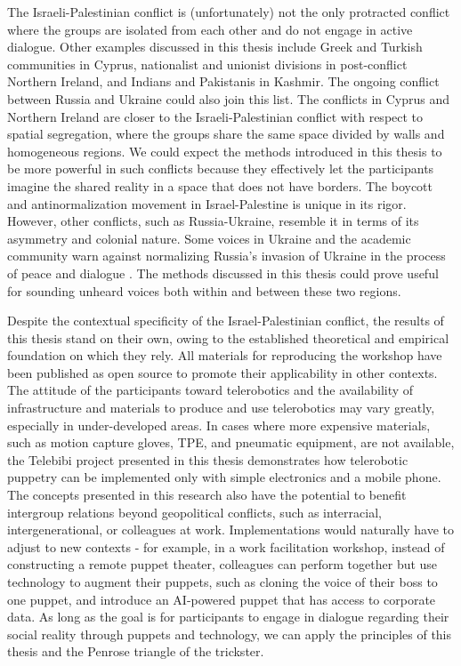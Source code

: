 \documentclass[dissertation,math,vertlayout,pdfa,colorlinks]{aaltoseries}
\begin{document}
The Israeli-Palestinian conflict is (unfortunately) not the only protracted conflict where the groups are isolated from each other and do not engage in active dialogue. Other examples discussed in this thesis include Greek and Turkish communities in Cyprus, nationalist and unionist divisions in post-conflict Northern Ireland, and Indians and Pakistanis in Kashmir. The ongoing conflict between Russia and Ukraine could also join this list. The conflicts in Cyprus and Northern Ireland are closer to the Israeli-Palestinian conflict with respect to spatial segregation, where the groups share the same space divided by walls and homogeneous regions. We could expect the methods introduced in this thesis to be more powerful in such conflicts because they effectively let the participants imagine the shared reality in a space that does not have borders. The boycott and antinormalization movement in Israel-Palestine is unique in its rigor. However, other conflicts, such as Russia-Ukraine, resemble it in terms of its asymmetry and colonial nature. Some voices in Ukraine and the academic community warn against normalizing Russia's invasion of Ukraine in the process of peace and dialogue \cite{makarychevNormalizeRationalizeIntellectuals2023}. The methods discussed in this thesis could prove useful for sounding unheard voices both within and between these two regions. 

Despite the contextual specificity of the Israel-Palestinian conflict, the results of this thesis stand on their own, owing to the established theoretical and empirical foundation on which they rely. All materials for reproducing the workshop have been published as open source to promote their applicability in other contexts. The attitude of the participants toward telerobotics and the availability of infrastructure and materials to produce and use telerobotics may vary greatly, especially in under-developed areas. In cases where more expensive materials, such as motion capture gloves, TPE, and pneumatic equipment, are not available, the Telebibi project presented in this thesis demonstrates how telerobotic puppetry can be implemented only with simple electronics and a mobile phone. The concepts presented in this research also have the potential to benefit intergroup relations beyond geopolitical conflicts, such as interracial, intergenerational, or colleagues at work. Implementations would naturally have to adjust to new contexts - for example, in a work facilitation workshop, instead of constructing a remote puppet theater, colleagues can perform together but use technology to augment their puppets, such as cloning the voice of their boss to one puppet, and introduce an AI-powered puppet that has access to corporate data. As long as the goal is for participants to engage in dialogue regarding their social reality through puppets and technology, we can apply the principles of this thesis and the Penrose triangle of the trickster.
\end{document}
